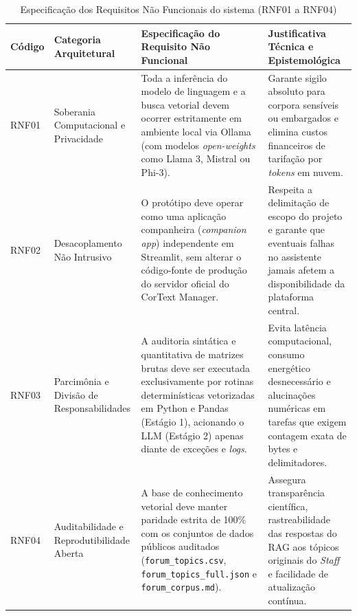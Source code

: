 \documentclass[
	oneside,
	a4paper,
	12pt,
	chapter=TITLE,
	section=TITLE,
	english,
	brazilian
]{abntex2}
\begin{document}
\begin{table}[htb]
  \caption{Especificação dos Requisitos Não Funcionais do sistema (RNF01 a RNF04)}
  \label{tab:tabela_9}
  \centering
  \small
  \setlength{\tabcolsep}{3.5pt}
  \begin{tabularx}{\textwidth}{|>{\centering\arraybackslash}p{1.4cm}|>{\raggedright\arraybackslash}p{3.2cm}|>{\raggedright\arraybackslash}X|>{\raggedright\arraybackslash}X|}
    \hline
    \textbf{Código} & \textbf{Categoria Arquitetural} & \textbf{Especificação do Requisito Não Funcional} & \textbf{Justificativa Técnica e Epistemológica} \\ \hline
    RNF01 & Soberania Computacional e Privacidade & Toda a inferência do modelo de linguagem e a busca vetorial devem ocorrer estritamente em ambiente local via Ollama (com modelos \textit{open-weights} como Llama 3, Mistral ou Phi-3). & Garante sigilo absoluto para corpora sensíveis ou embargados e elimina custos financeiros de tarifação por \textit{tokens} em nuvem. \\ \hline
    RNF02 & Desacoplamento Não Intrusivo & O protótipo deve operar como uma aplicação companheira (\textit{companion app}) independente em Streamlit, sem alterar o código-fonte de produção do servidor oficial do CorText Manager. & Respeita a delimitação de escopo do projeto e garante que eventuais falhas no assistente jamais afetem a disponibilidade da plataforma central. \\ \hline
    RNF03 & Parcimônia e Divisão de Responsabilidades & A auditoria sintática e quantitativa de matrizes brutas deve ser executada exclusivamente por rotinas determinísticas vetorizadas em Python e Pandas (Estágio 1), acionando o LLM (Estágio 2) apenas diante de exceções e \textit{logs}. & Evita latência computacional, consumo energético desnecessário e alucinações numéricas em tarefas que exigem contagem exata de bytes e delimitadores. \\ \hline
    RNF04 & Auditabilidade e Reprodutibilidade Aberta & A base de conhecimento vetorial deve manter paridade estrita de 100\% com os conjuntos de dados públicos auditados (\texttt{forum\_\allowbreak topics.\allowbreak csv}, \texttt{forum\_\allowbreak topics\_\allowbreak full.\allowbreak json} e \texttt{forum\_\allowbreak corpus.\allowbreak md}). & Assegura transparência científica, rastreabilidade das respostas do RAG aos tópicos originais do \textit{Staff} e facilidade de atualização contínua. \\ \hline
  \end{tabularx}
\end{table}
\FloatBarrier
\end{document}

